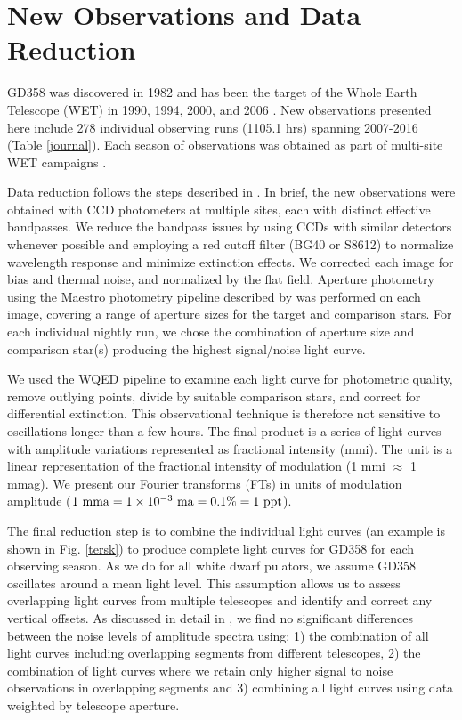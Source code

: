 \documentclass[12pt,preprint]{aastex}
\begin{document}
\section {New Observations and Data Reduction}\label{data}

GD358 was discovered in 1982 \citep{Winget82} and has been the target of the Whole 
Earth Telescope (WET) in 1990, 1994, 2000, and 2006 \citep{Provencal09, Kepler03,Winget94}. 
New observations presented here include 278 individual observing runs (1105.1 hrs) spanning 
2007-2016 (Table \ref{journal}). Each season of observations was obtained as part of 
multi-site WET campaigns \citep{wet90}. 

Data reduction follows the steps described in \citet{Provencal12}. In brief, the new observations 
were obtained with CCD photometers at multiple sites, each with distinct effective bandpasses. 
We reduce the bandpass issues by using CCDs with similar detectors whenever possible and 
employing a red cutoff filter (BG40 or S8612) to normalize wavelength response and 
minimize extinction effects. We corrected each image for bias and thermal noise, and 
normalized by the flat field. Aperture photometry using the Maestro photometry pipeline 
described by \citet{Dalessio10} was performed on each image, covering a range of 
aperture sizes for the target and comparison stars. For each individual nightly run, we 
chose the combination of aperture size and comparison star(s) producing the highest 
signal/noise light curve. 

We used the WQED pipeline \citep{wqed} to examine each light curve for photometric 
quality, remove outlying points, divide by suitable comparison stars, and correct for 
differential extinction. This observational technique is therefore not sensitive to 
oscillations longer than a few hours. The final product is a series of light curves 
with amplitude variations represented as fractional intensity (mmi). The unit is a linear 
representation of the fractional intensity of modulation (1 mmi $\approx$ 1 mmag). We present
our Fourier transforms (FTs) in units of modulation amplitude 
($1\ {\rm mma}=1 \times 10^{-3}\ {\rm ma} = 0.1 \% = 1\ {\rm ppt}$).

The final reduction step is to combine the individual light curves 
(an example is shown in Fig. \ref{tersk}) to produce complete light curves for GD358 for each 
observing season. As we do for all white dwarf pulators, we assume GD358 oscillates around 
a mean light level. This assumption allows us to assess overlapping light curves from multiple 
telescopes and identify and correct any vertical offsets. As discussed in detail in \citet{Provencal09}, we find 
no significant differences between the noise levels of amplitude spectra using: 
1) the combination of all light curves including overlapping 
segments from different telescopes, 2) the combination of light curves where we retain 
only higher signal to noise observations in overlapping segments and 3) combining all light 
curves using data weighted by telescope aperture.
\end{document}
